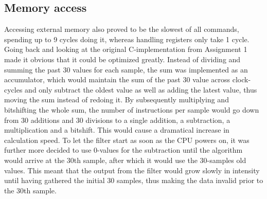 \documentclass[12pt,a4paper]{article}
\begin{document}
\subsection{Memory access}
Accessing external memory also proved to be the slowest of all commands, spending up to 9 cycles doing it, whereas handling registers only take 1 cycle. Going back and looking at the original C-implementation from Assignment 1 made it obvious that it could be optimized greatly. Instead of dividing and summing the past 30 values for each sample, the sum was implemented as an accumulator, which would maintain the sum of the past 30 value across clock-cycles and only subtract the oldest value as well as adding the latest value, thus moving the sum instead of redoing it. By subsequently multiplying and bitshifting the whole sum, the number of instructions per sample would go down from 30 additions and 30 divisions to a single addition, a subtraction, a multiplication and a bitshift. This would cause a dramatical increase in calculation speed. To let the filter start as soon as the CPU powers on, it was further more decided to use 0-values for the subtraction until the algorithm would arrive at the 30th sample, after which it would use the 30-samples old values. This meant that the output from the filter would grow slowly in intensity until having gathered the initial 30 samples, thus making the data invalid prior to the 30th sample.
	
\end{document}
